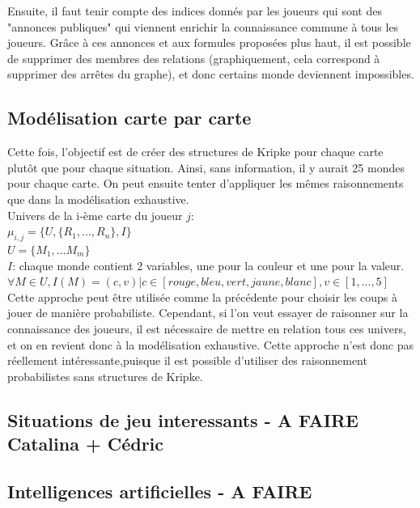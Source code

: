 \documentclass[11pt, letterpaper]{article}
\begin{document}
\noindent
Ensuite, il faut tenir compte des indices donnés par les joueurs qui sont des "annonces publiques" qui viennent enrichir la connaissance commune à tous les joueurs. Grâce à ces annonces et aux formules proposées plus haut, il est possible de supprimer des membres des relations (graphiquement, cela correspond à supprimer des arrêtes du graphe), et donc certains monde deviennent impossibles.


\subsection{Modélisation carte par carte}

\noindent
Cette fois, l'objectif est de créer des structures de Kripke pour chaque carte plutôt que pour chaque situation. Ainsi, sans information, il y aurait 25 mondes pour chaque carte. On peut ensuite tenter d'appliquer les mêmes raisonnements que dans la modélisation exhaustive.\\

Univers de la i-ème carte du joueur $j$:\\

$   \mu_{i,j}=\{U,\{R_{1},...,R_{n}\},I \}  $\\

$   U=\{M_{1},...M_{m} \}   $\\

$I$: chaque monde contient 2 variables, une pour la couleur et une pour la valeur. \\

$\forall M \in U, I(M)=(c,v)|c\in[rouge,bleu,vert,jaune,blanc],v\in[1,...,5]$\\

\noindent
Cette approche peut être utilisée comme la précédente pour choisir les coups à jouer de manière probabiliste. Cependant, si l'on veut essayer de raisonner sur la connaissance des joueurs, il est nécessaire de mettre en relation tous ces univers, et on en revient donc à la modélisation exhaustive. Cette approche n'est donc pas réellement intéressante,puisque il est possible d'utiliser des raisonnement probabilistes sans structures de Kripke. 

\subsection{Situations de jeu interessants - A FAIRE Catalina + Cédric}

\subsection{Intelligences artificielles - A FAIRE}
\end{document}
